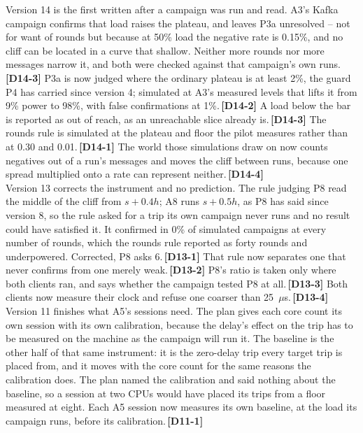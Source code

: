 \documentclass[11pt]{article}
\newcommand{\chgold}[1]{\,{\color{oldcol}\bfseries\footnotesize[#1]}}
\begin{document}
{Version 14 is the first written after a campaign was run and read. A3's Kafka campaign confirms that load raises the plateau, and leaves P3a unresolved -- not for want of rounds but because at 50\% load the negative rate is 0.15\%, and no cliff can be located in a curve that shallow. Neither more rounds nor more messages narrow it, and both were checked against that campaign's own runs.\chgold{D14-3} P3a is now judged where the ordinary plateau is at least 2\%, the guard P4 has carried since version 4; simulated at A3's measured levels that lifts it from 9\% power to 98\%, with false confirmations at 1\%.\chgold{D14-2} A load below the bar is reported as out of reach, as an unreachable slice already is.\chgold{D14-3} The rounds rule is simulated at the plateau and floor the pilot measures rather than at 0.30 and 0.01.\chgold{D14-1} The world those simulations draw on now counts negatives out of a run's messages and moves the cliff between runs, because one spread multiplied onto a rate can represent neither.\chgold{D14-4}\\[3pt]
Version 13 corrects the instrument and no prediction. The rule judging P8 read the middle of the cliff from $s + 0.4h$; A8 runs $s + 0.5h$, as P8 has said since version 8, so the rule asked for a trip its own campaign never runs and no result could have satisfied it. It confirmed in 0\% of simulated campaigns at every number of rounds, which the rounds rule reported as forty rounds and underpowered. Corrected, P8 asks 6.\chgold{D13-1} That rule now separates one that never confirms from one merely weak.\chgold{D13-2} P8's ratio is taken only where both clients ran, and says whether the campaign tested P8 at all.\chgold{D13-3} Both clients now measure their clock and refuse one coarser than 25~$\mu$s.\chgold{D13-4}\\[3pt]
Version 11 finishes what A5's sessions need. The plan gives each core count its own session with its own calibration, because the delay's effect on the trip has to be measured on the machine as the campaign will run it. The baseline is the other half of that same instrument: it is the zero-delay trip every target trip is placed from, and it moves with the core count for the same reasons the calibration does. The plan named the calibration and said nothing about the baseline, so a session at two CPUs would have placed its trips from a floor measured at eight. Each A5 session now measures its own baseline, at the load its campaign runs, before its calibration.\chgold{D11-1}\\[3pt]
}
\end{document}
